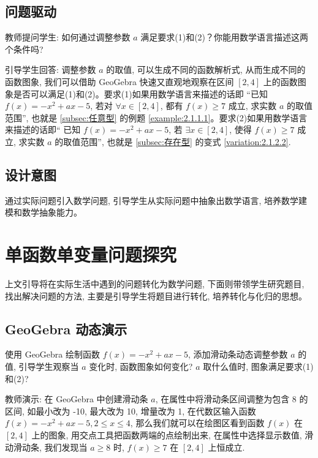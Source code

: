 \subsection{问题驱动}
教师提问学生: 如何通过调整参数 \(a\) 满足要求(1)和(2)？你能用数学语言描述这两个条件吗?

引导学生回答: 调整参数 \(a\) 的取值, 可以生成不同的函数解析式, 从而生成不同的函数图象, 我们可以借助 GeoGebra 快速又直观地观察在区间 $[2, 4]$ 上的函数图象是否可以满足(1)和(2)。要求(1)如果用数学语言来描述的话即 “已知 \(f(x)  =  - {x}^{2} + {ax} - 5\), 若对 \(\forall x \in  \left\lbrack  {2, 4}\right\rbrack\), 都有 \(f(x)  \geq  7\) 成立, 求实数 \(a\) 的取值范围”, 也就是 \ref{subsec:任意型} 的例题 \ref{example:2.1.1.1}。要求(2)如果用数学语言来描述的话即“ 已知 \(f(x)  =  - {x}^{2} + {ax} - 5\), 若 \(\exists x \in  \left\lbrack  {2, 4}\right\rbrack\), 使得 \(f(x)  \geq  7\) 成立, 求实数 \(a\) 的取值范围”, 也就是 \ref{subsec:存在型} 的变式 \ref{variation:2.1.2.2}.


\subsection{设计意图}
通过实际问题引入数学问题, 引导学生从实际问题中抽象出数学语言, 培养数学建模和数学抽象能力。


\section{单函数单变量问题探究}
上文引导将在实际生活中遇到的问题转化为数学问题, 下面则带领学生研究题目, 找出解决问题的方法, 主要是引导学生将题目进行转化, 培养转化与化归的思想。


\subsection{GeoGebra 动态演示}
使用 GeoGebra 绘制函数 \(f(x)  =  - {x}^{2} + {ax} - 5\), 添加滑动条动态调整参数 \(a\) 的值, 引导学生观察当 \(a\) 变化时, 函数图象如何变化? \(a\) 取什么值时, 图象满足要求(1)和(2)?

教师演示: 在 GeoGebra 中创建滑动条 \(a\), 在属性中将滑动条区间调整为包含 8 的区间, 如最小改为 -10, 最大改为 10, 增量改为 1, 在代数区输入函数 \(f(x)  =  - {x}^{2} + {ax} - 5, 2 \leq  x \leq  4\), 那么我们就可以在绘图区看到函数 \(f(x)\) 在 \(\left\lbrack  {2, 4}\right\rbrack\) 上的图象, 用交点工具把函数两端的点绘制出来, 在属性中选择显示数值, 滑动滑动条, 我们发现当 \(a \geq  8\) 时, \(f(x)  \geq  7\) 在 \(\left\lbrack  {2, 4}\right\rbrack\) 上恒成立.

